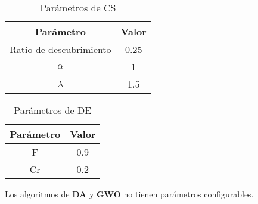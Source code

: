 \begin{table}[H]
    \centering
    \begin{tabular}{ c c }
        \hline
        \textbf{Parámetro}      & \textbf{Valor} \\
        \hline
        Ratio de descubrimiento & 0.25           \\
        $\alpha$                & 1              \\
        $\lambda$               & 1.5            \\
        \hline
    \end{tabular}
    \caption{Parámetros de CS}
\end{table}

\begin{table}[H]
    \centering
    \begin{tabular}{ c c }
        \hline
        \textbf{Parámetro} & \textbf{Valor} \\
        \hline
        F                  & 0.9            \\
        Cr                 & 0.2            \\
        \hline
    \end{tabular}
    \caption{Parámetros de DE}
\end{table}

Los algoritmos de \textbf{DA} y \textbf{GWO} no tienen parámetros configurables.